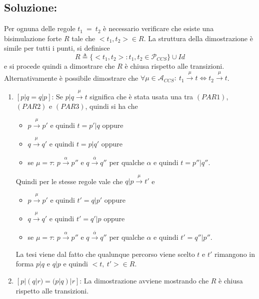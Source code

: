 \documentclass[a4paper,twosides]{report}
\begin{document}
\subsection*{Soluzione:}
Per ognuna delle regole $t_1\ =\ t_2$ \`e necessario verificare che esiste una
bisimulazione forte $R$ tale che $<t_1,t_2>\in R$. La struttura della
dimostrazione \`e simile per tutti i punti, si definisce
$$
R\triangleq\{<t_1,t_2>:t_1,t_2\in\mathcal{P}_{CCS}\}\cup Id
$$
e si procede quindi a dimostrare che $R$ \`e chiusa rispetto alle
transizioni. Alternativamente \`e possibile dimostrare che
$\forall\mu\in\mathcal{A}_{CCS}:\ t_1\xrightarrow{\mu}t\iff
t_2\xrightarrow{\mu}t$. 
\begin{enumerate}
\item $[p|q=q|p]$: Se $p|q\xrightarrow{\mu}t$ significa che è stata usata una tra
  $(PAR1)$, $(PAR2)$ e $(PAR3)$, quindi si ha che
  \begin{itemize}
  \item $p\xrightarrow{\mu}p'$ e quindi $t=p'|q$ oppure
  \item $q\xrightarrow{\mu}q'$ e quindi $t=p|q'$ oppure
  \item se $\mu = \tau$: $p\xrightarrow{\alpha}p''$ e
    $q\xrightarrow{\overline{\alpha}}q''$ per qualche $\alpha$  e quindi $t=p''|q''$.
  \end{itemize}
  Quindi per le stesse regole vale che $q|p\xrightarrow{\mu}t'$ e
  \begin{itemize}
  \item $p\xrightarrow{\mu}p'$ e quindi $t'=q|p'$ oppure
  \item $q\xrightarrow{\mu}q'$ e quindi $t'=q'|p$ oppure
  \item se $\mu = \tau$: $p\xrightarrow{\alpha}p''$ e
    $q\xrightarrow{\overline{\alpha}}q''$ per qualche $\alpha$  e quindi $t'=q''|p''$.
  \end{itemize}
 La tesi viene dal fatto che qualunque percorso viene scelto
 $t$ e $t'$ rimangono in forma $p|q$ e $q|p$ e quindi $<t,\ t'>\in R$.
\item $[p|(q|r)=(p|q)|r]$: La dimostrazione avviene mostrando che
  $R$ \`e chiusa rispetto alle transizioni.


\end{enumerate}
\end{document}
